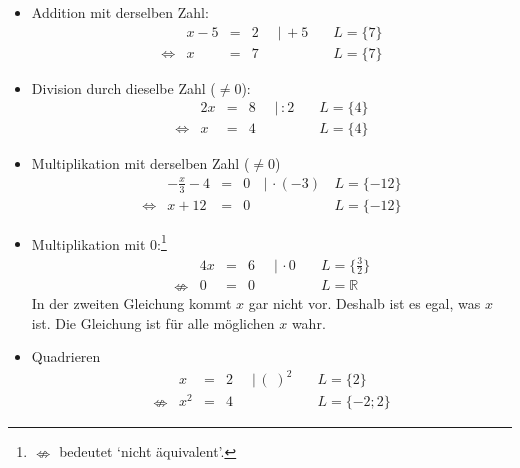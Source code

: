 \documentclass[%
11pt,%
twoside,%
titlepage,%
german,%
]{scrartcl}
\begin{document}
\begin{itemize}
\item Addition mit derselben Zahl:
  \begin{displaymath}
    \begin{array}{rrclll}
      & x-5 & = & 2 \;\; & |\,+5 \quad & L = \{7\} \\
      \Leftrightarrow  & x & = & 7 & & L = \{7\}
    \end{array}
  \end{displaymath}
  
\item Division durch dieselbe Zahl ($\neq 0$):
  \begin{displaymath}
    \begin{array}{rrclll}
      & 2x & = & 8 \;\; & |\,:2 \quad & L = \{4\} \\
      \Leftrightarrow & x & = & 4 & & L = \{4\}
    \end{array}
  \end{displaymath}

\item Multiplikation mit derselben Zahl ($\neq 0$)
  \begin{displaymath}
    \begin{array}{rrclll}
      & -\frac{x}{3}-4 & = & 0 \, & |\,\cdot(-3) \, & L = \{-12\} \\
      \Leftrightarrow \!\!\! & x + 12 & = & 0 & &  L = \{-12\}
    \end{array}
  \end{displaymath}
  
\item Multiplikation mit 0:\footnote{$\nLeftrightarrow$ bedeutet `nicht \"aquivalent'.}
  \begin{displaymath}
    \begin{array}{rrclll}
      & 4x & = & 6 \;\; & |\,\cdot 0 \quad & L = \{\frac{3}{2}\} \\
      \nLeftrightarrow & 0 & = & 0 & & L = \mathbb{R}
    \end{array}
  \end{displaymath}
  In der zweiten Gleichung kommt $x$ gar nicht vor. Deshalb ist es egal, was $x$ ist. Die Gleichung ist f\"ur alle m\"oglichen $x$ wahr.

\item Quadrieren
  \begin{displaymath}
    \begin{array}{rrclll}
      & x & = & 2 \;\; & |\,(\;)^2 \quad & L = \{2\} \\
      \nLeftrightarrow & x^2 & = & 4 & & L = \{-2;2\}
    \end{array}
  \end{displaymath}
\end{itemize}
\end{document}
